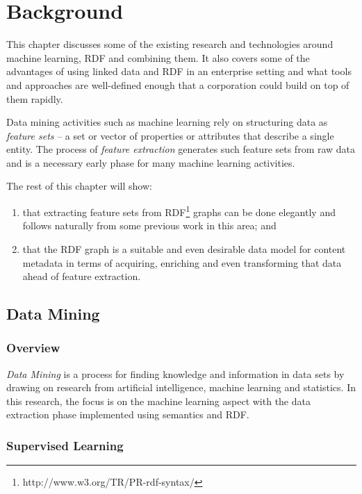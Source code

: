 \chapter{Background}

This chapter discusses some of the existing research and technologies
around machine learning, RDF and combining them. It also covers some
of the advantages of using linked data and RDF in an enterprise
setting and what tools and approaches are well-defined enough that a
corporation could build on top of them rapidly.

Data mining activities such as machine learning rely on structuring
data as \emph{feature sets}\cite{bishop2006pattern} -- a set or vector
of properties or attributes that describe a single entity.
The process of \emph{feature extraction} generates such feature sets
from raw data and is a necessary early phase for many machine learning
activities.

The rest of this chapter will show:

\begin{enumerate}
\item that extracting feature sets from
  RDF\footnote{http://www.w3.org/TR/PR-rdf-syntax/} graphs can be done
  elegantly and follows naturally from some previous work in this area; and
\item that the RDF graph is a suitable and even desirable data model for content
  metadata in terms of acquiring, enriching and even transforming that data ahead
  of feature extraction.
\end{enumerate}

\section{Data Mining}
\subsection{Overview}

\emph{Data Mining} is a process for finding knowledge and information
in data sets by drawing on research from artificial intelligence,
machine learning and statistics.\cite{han2011data} In this research,
the focus is on the machine learning aspect with
the data extraction phase implemented using semantics and RDF.

\subsection{Supervised Learning}

